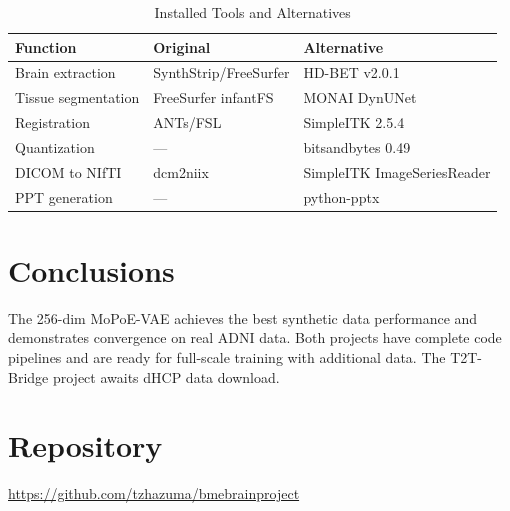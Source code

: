 \documentclass[11pt,a4paper]{article}
\begin{document}
\begin{table}[H]
\centering
\caption{Installed Tools and Alternatives}
\begin{tabular}{lll}
\toprule
\textbf{Function} & \textbf{Original} & \textbf{Alternative} \\
\midrule
Brain extraction & SynthStrip/FreeSurfer & HD-BET v2.0.1 \\
Tissue segmentation & FreeSurfer infantFS & MONAI DynUNet \\
Registration & ANTs/FSL & SimpleITK 2.5.4 \\
Quantization & — & bitsandbytes 0.49 \\
DICOM to NIfTI & dcm2niix & SimpleITK ImageSeriesReader \\
PPT generation & — & python-pptx \\
\bottomrule
\end{tabular}
\end{table}

\section{Conclusions}
The 256-dim MoPoE-VAE achieves the best synthetic data performance and demonstrates convergence on real ADNI data. Both projects have complete code pipelines and are ready for full-scale training with additional data. The T2T-Bridge project awaits dHCP data download.

\section{Repository}
\url{https://github.com/tzhazuma/bmebrainproject}
\end{document}
